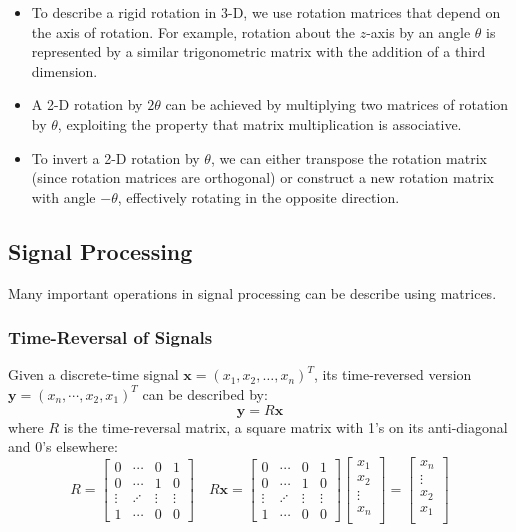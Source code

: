 \begin{itemize}
    \item To describe a rigid rotation in 3-D, we use rotation matrices that depend on the axis of rotation. For example, rotation about the \( z \)-axis by an angle \( \theta \) is represented by a similar trigonometric matrix with the addition of a third dimension.
    \item A 2-D rotation by \( 2\theta \) can be achieved by multiplying two matrices of rotation by \( \theta \), exploiting the property that matrix multiplication is associative.
    \item To invert a 2-D rotation by \( \theta \), we can either transpose the rotation matrix (since rotation matrices are orthogonal) or construct a new rotation matrix with angle \( -\theta \), effectively rotating in the opposite direction.
\end{itemize}




\subsection{Signal Processing}
Many important operations in signal processing can be describe using matrices.



\subsubsection*{Time-Reversal of Signals}
Given a discrete-time signal \( \mathbf{x} = (x_1, x_2, \ldots, x_n)^T \), its time-reversed version \( \mathbf{y}  = (x_n, \cdots, x_2, x_1)^T\) can be described by:
\[ \mathbf{y} = R\mathbf{x} \]
where \( R \) is the time-reversal matrix, a square matrix with 1's on its anti-diagonal and 0's elsewhere:
\[ R = \begin{bmatrix}
0 & \cdots & 0 & 1 \\
0& \cdots & 1 & 0 \\
\vdots  & \iddots & \vdots & \vdots \\
1 & \cdots & 0 & 0
\end{bmatrix} 
\quad R\mathbf{x} = \begin{bmatrix}
0 & \cdots & 0 & 1 \\
0& \cdots & 1 & 0 \\
\vdots  & \iddots & \vdots & \vdots \\
1 & \cdots & 0 & 0
\end{bmatrix} \begin{bmatrix}
    x_1 \\ x_2 \\ \vdots \\ x_n \\ 
\end{bmatrix} =\begin{bmatrix}
    x_n \\ \vdots \\ x_2 \\ x_1 \\ 
\end{bmatrix}   \]

